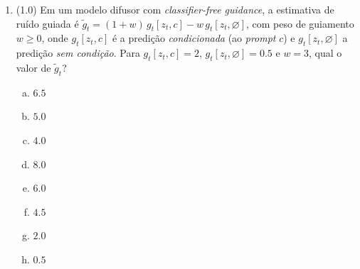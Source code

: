 \documentclass[11pt,a4paper]{article}
\begin{document}
\begin{enumerate}[1)]
\item (1.0) Em um modelo difusor com \textit{classifier-free guidance}, a estimativa de ruído guiada é $\tilde{g}_t = (1 + w)\,g_t[z_t, c] - w\,g_t[z_t, \varnothing]$, com peso de guiamento $w \ge 0$, onde $g_t[z_t, c]$ é a predição \emph{condicionada} (ao \textit{prompt} $c$) e $g_t[z_t, \varnothing]$ a predição \emph{sem condição}. Para $g_t[z_t, c] = 2$, $g_t[z_t, \varnothing] = 0.5$ e $w = 3$, qual o valor de $\tilde{g}_t$?

\begin{enumerate}[a)]
    \item $6.5$
    \item $5.0$
    \item $4.0$
    \item $8.0$
    \item $6.0$
    \item $4.5$
    \item $2.0$
    \item $0.5$
\end{enumerate}

\end{enumerate}
\end{document}
